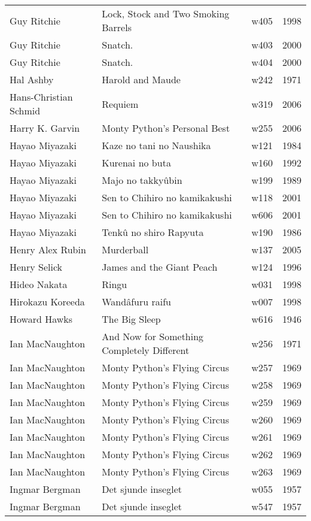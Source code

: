 \documentclass{article}
\begin{document}
\begin {center}
\begin{longtable}{l p{10cm} l l}
Guy Ritchie & Lock, Stock and Two Smoking Barrels & w405 & 1998 \\
Guy Ritchie & Snatch. & w403 & 2000 \\
Guy Ritchie & Snatch. & w404 & 2000 \\
Hal Ashby & Harold and Maude & w242 & 1971 \\
Hans-Christian Schmid & Requiem & w319 & 2006 \\
Harry K. Garvin & Monty Python's Personal Best & w255 & 2006 \\
Hayao Miyazaki & Kaze no tani no Naushika & w121 & 1984 \\
Hayao Miyazaki & Kurenai no buta & w160 & 1992 \\
Hayao Miyazaki & Majo no takkyûbin & w199 & 1989 \\
Hayao Miyazaki & Sen to Chihiro no kamikakushi & w118 & 2001 \\
Hayao Miyazaki & Sen to Chihiro no kamikakushi & w606 & 2001 \\
Hayao Miyazaki & Tenkû no shiro Rapyuta & w190 & 1986 \\
Henry Alex Rubin & Murderball & w137 & 2005 \\
Henry Selick & James and the Giant Peach & w124 & 1996 \\
Hideo Nakata & Ringu & w031 & 1998 \\
Hirokazu Koreeda & Wandâfuru raifu & w007 & 1998 \\
Howard Hawks & The Big Sleep & w616 & 1946 \\
Ian MacNaughton & And Now for Something Completely Different & w256 & 1971 \\
Ian MacNaughton & Monty Python's Flying Circus & w257 & 1969 \\
Ian MacNaughton & Monty Python's Flying Circus & w258 & 1969 \\
Ian MacNaughton & Monty Python's Flying Circus & w259 & 1969 \\
Ian MacNaughton & Monty Python's Flying Circus & w260 & 1969 \\
Ian MacNaughton & Monty Python's Flying Circus & w261 & 1969 \\
Ian MacNaughton & Monty Python's Flying Circus & w262 & 1969 \\
Ian MacNaughton & Monty Python's Flying Circus & w263 & 1969 \\
Ingmar Bergman & Det sjunde inseglet & w055 & 1957 \\
Ingmar Bergman & Det sjunde inseglet & w547 & 1957 \\

\end{longtable}
\end{center}
\end{document}
